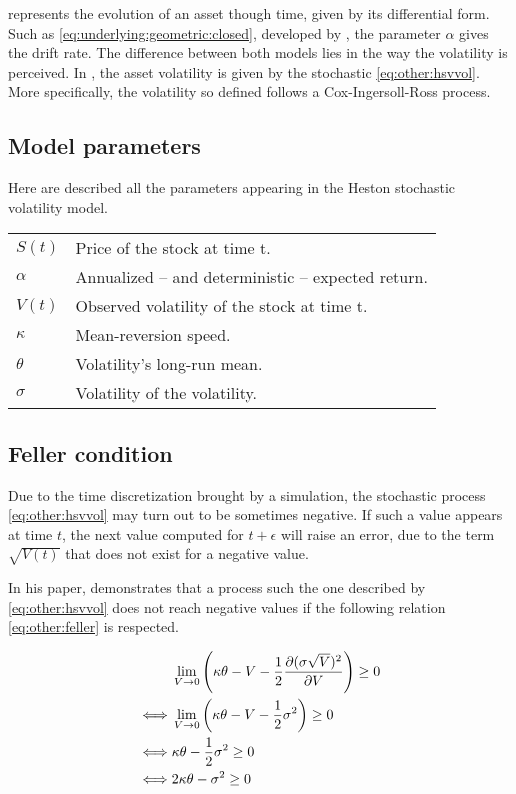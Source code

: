 \documentclass[12pt,a4paper]{report}
\begin{document}
 represents the evolution of an asset though time, given by its differential form. 
Such as \cref{eq:underlying:geometric:closed}, developed by \citet{bs}, the parameter $\alpha$ gives the drift rate. The difference between both models lies in the way the volatility is perceived. In \citet{heston1993}, the asset volatility is given by the stochastic \cref{eq:other:hsvvol}. More specifically, the volatility so defined follows a Cox-Ingersoll-Ross process.

\subsection{Model parameters}
\label{sub:other:heston:model}

Here are described all the parameters appearing in the Heston stochastic volatility model.

\begin{tabular}{ll}
  $S(t)$ & Price of the stock at time t. \\
  $\alpha$ &  Annualized -- and deterministic -- expected return. \\
  $V(t)$ & Observed volatility of the stock at time t. \\
  $\kappa$ & Mean-reversion speed. \\
  $\theta$ & Volatility's long-run mean. \\
  $\sigma$ & Volatility of the volatility. 
\end{tabular}

\subsection{Feller condition}
\label{sub:other:heston:feller}

Due to the time discretization brought by a simulation, the stochastic process \ref{eq:other:hsvvol} may turn out to be sometimes negative. If such a value appears at time $t$, the next value computed for $t+\epsilon$ will raise an error, due to the term $\sqrt{V(t)}$ that does not exist for a negative value.

In his paper, \citet{feller1951} demonstrates that a process such the one described by \cref{eq:other:hsvvol} does not reach negative values if the following relation \ref{eq:other:feller} is respected.

\begin{align}
  &\lim_{V\to 0} \left( \kappa \theta - V - \frac{1}{2} \frac{\partial(\sigma \sqrt{V})^2}{\partial V} \right) \geq 0 \label{eq:other:feller} \\
  \iff &\lim_{V\to 0} \left( \kappa \theta - V - \frac{1}{2} \sigma^2 \right) \geq 0 \notag \\
  \iff &\kappa \theta  - \frac{1}{2} \sigma^2  \geq 0 \notag \\
  \iff & 2 \kappa \theta  - \sigma^2  \geq 0 \label{eq:other:feller:heston}
\end{align}
\end{document}
